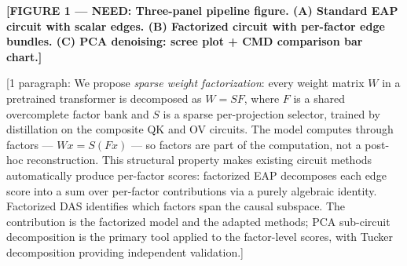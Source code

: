 \documentclass[11pt]{article}
\begin{document}
%
%
%
%
%

\textbf{[FIGURE 1 --- NEED: Three-panel pipeline figure. (A) Standard EAP circuit
with scalar edges. (B) Factorized circuit with per-factor edge bundles.
(C) PCA denoising: scree plot + CMD comparison bar chart.]}


[1 paragraph: We propose \emph{sparse weight factorization}: every weight
matrix $W$ in a pretrained transformer is decomposed as $W = SF$, where
$F$ is a shared overcomplete factor bank and $S$ is a sparse per-projection
selector, trained by distillation on the composite QK and OV circuits.
The model computes through factors --- $Wx = S(Fx)$ --- so factors are
part of the computation, not a post-hoc reconstruction. This structural
property makes existing circuit methods automatically produce per-factor
scores: factorized EAP decomposes each edge score into a sum over
per-factor contributions via a purely algebraic identity. Factorized DAS
identifies which factors span the causal subspace. The contribution is
the factorized model and the adapted methods; PCA sub-circuit
decomposition is the primary tool applied to the factor-level scores,
with Tucker decomposition providing independent validation.]


\end{document}
